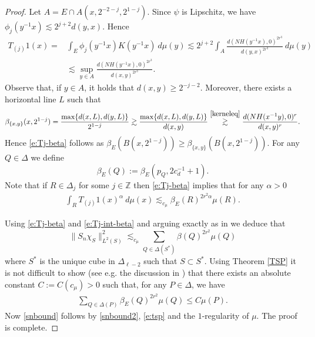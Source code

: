 \documentclass[11pt]{amsart}
\theoremstyle{definition}
\newcommand{\Z}{\mathbb{Z}}
\numberwithin{theorem}{section} \numberwithin{equation}{section}
\begin{document}
\begin{proof}
Let $A = E \cap A(x,2^{-2-j},2^{1-j})$.  Since $\psi$ is Lipschitz, we have $\phi_j(y^{-1}x) \lesssim 2^{j+2} d(y,x)$. 
Hence
  \begin{equation*}
  \begin{split}
    T_{(j)}1(x) = &\int_E \phi_j(y^{-1}x) K(y^{-1}x) ~d\mu(y) \lesssim 2^{j+2} \int_A \frac{d(NH(y^{-1}x), 0)^{2r^3}}{d(y,x)^{2r^3}} ~d\mu(y)  \\
    &\lesssim \sup_{y \in A} \frac{d(NH(y^{-1}x), 0)^{2r^3}}{d(x,y)^{2r^3}}.
    \end{split}
  \end{equation*}
Observe that, if $y \in A$, it holds that $d(x,y) \geq 2^{-j-2}$. Moreover, there exists a horizontal line $L$ such that  \begin{align*}
    \beta_{\{x,y\}}(x,2^{1-j}) = \frac{\max\{d(x,L),d(y,L)\}}{2^{1-j}} \gtrsim \frac{\max\{d(x,L),d(y,L)\}}{d(x,y)} \overset{\eqref{kerneleq}}{\gtrsim} \frac{d(NH(x^{-1}y),0)^{r}}{d(x,y)^r}.
  \end{align*}
Hence \eqref{e:Tj-beta} follows as $\beta_E(B(x,2^{1-j})) \geq \beta_{\{x,y\}}(B(x,2^{1-j}))$. For any $Q \in \Delta$ we define $$\beta_E(Q):=\beta_E (p_Q, 2c_d^{-1}+1).$$ Note that if $R \in \Delta_j$ for some $j \in \Z$ then  \eqref{e:Tj-beta} implies that for any $\alpha > 0$
 \begin{align}
 \int_R T_{(j)}1(x)^\alpha ~d\mu(x) \lesssim_{c_\mu} \beta_E(R)^{2r^2\alpha} \mu(R). \label{e:Tj-int-beta}
 \end{align}
 
 Using \eqref{e:Tj-beta} and \eqref{e:Tj-int-beta} and arguing exactly as in \cite[pp 1416-1417]{ChoLi} we deduce that 
\begin{equation}
\label{snbound2}
\|S_n\chi_S\|_{L^2(S)}^2 \lesssim_{c_\mu} \sum_{Q \in \Delta(S^*)} \beta(Q)^{2r^2}\mu(Q) 
\end{equation}
where $S^*$ is the unique cube in $\Delta_{\ell-2}$ such that $S \subset S^*$. 
Using Theorem \ref{TSP} it is not difficult to show (see e.g. the discussion in \cite[Proposition 3.1]{ChoLi}) that there exists an absolute constant $C:=C(c_\mu)>0$ such that, for any $P \in \Delta$, we have
 \begin{align}
    \sum_{Q \in \Delta(P)} \beta_E(Q)^{2r^2} \mu(Q) \leq C \mu(P). \label{e:tsp}
 \end{align}
Now \eqref{snbound} follows by  \eqref{snbound2}, \eqref{e:tsp} and the $1$-regularity of $\mu$. The proof is complete.
\end{proof}



\end{document}
